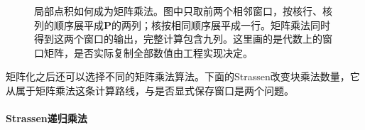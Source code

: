 \begin{figure}[htb]
  \centering
  
  \caption{局部点积如何成为矩阵乘法。图中只取前两个相邻窗口，按核行、核列的顺序展平成$\bm P$的两列；核按相同顺序展平成一行。矩阵乘法同时得到这两个窗口的输出，完整计算包含九列。这里画的是代数上的窗口矩阵，是否实际复制全部数值由工程实现决定。}
  \label{fig:cnn-matrix-algorithm}
\end{figure}
矩阵化之后还可以选择不同的矩阵乘法算法。下面的Strassen改变块乘法数量，它从属于矩阵乘法这条计算路线，与是否显式保存窗口是两个问题。

\paragraph{Strassen递归乘法}
\label{sec:cnn-strassen}

